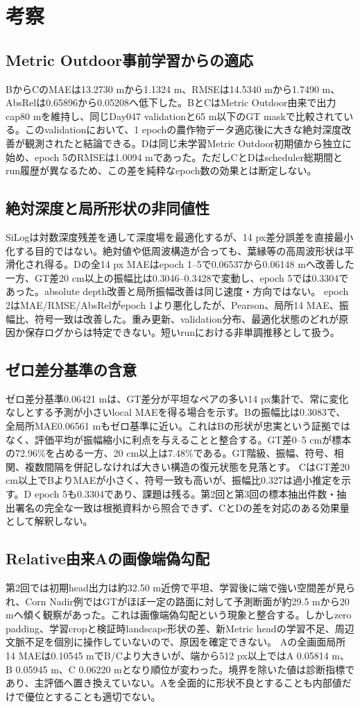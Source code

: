 \chapter{考察}
\section{Metric Outdoor事前学習からの適応}
BからCのMAEは13.2730 mから1.1324 m、RMSEは14.5340 mから1.7490 m、AbsRelは0.65896から0.05208へ低下した。BとCはMetric Outdoor由来で出力cap80 mを維持し、同じDay047 validationと65 m以下のGT maskで比較されている。このvalidationにおいて、1 epochの農作物データ適応後に大きな絶対深度改善が観測されたと結論できる。Dは同じ未学習Metric Outdoor初期値から独立に始め、epoch 5のRMSEは1.0094 mであった。ただしCとDはscheduler総期間とrun履歴が異なるため、この差を純粋なepoch数の効果とは断定しない。
\section{絶対深度と局所形状の非同値性}
SiLogは対数深度残差を通して深度場を最適化するが、14 px差分誤差を直接最小化する目的ではない。絶対値や低周波構造が合っても、葉縁等の高周波形状は平滑化され得る。Dの全14 px MAEはepoch 1--5で0.06537から0.06148 mへ改善した一方、GT差20 cm以上の振幅比は0.3046--0.3428で変動し、epoch 5では0.3304であった。absolute depth改善と局所振幅改善は同じ速度・方向ではない。
epoch 2はMAE/RMSE/AbsRelがepoch 1より悪化したが、Pearson、局所14 MAE、振幅比、符号一致は改善した。重み更新、validation分布、最適化状態のどれが原因か保存ログからは特定できない。短いrunにおける非単調推移として扱う。
\section{ゼロ差分基準の含意}
ゼロ差分基準0.06421 mは、GT差分が平坦なペアの多い14 px集計で、常に変化なしとする予測が小さいlocal MAEを得る場合を示す。Bの振幅比は0.3083で、全局所MAE0.06561 mもゼロ基準に近い。これはBの形状が忠実という証拠ではなく、評価平均が振幅縮小に利点を与えることと整合する。GT差0--5 cmが標本の72.96\%を占める一方、20 cm以上は7.48\%である。GT階級、振幅、符号、相関、複数間隔を併記しなければ大きい構造の復元状態を見落とす。
CはGT差20 cm以上でBよりMAEが小さく、符号一致も高いが、振幅比0.327は過小推定を示す。D epoch 5も0.3304であり、課題は残る。第2回と第3回の標本抽出件数・抽出署名の完全な一致は根拠資料から照合できず、CとDの差を対応のある効果量として解釈しない。
\section{Relative由来Aの画像端偽勾配}
第2回では初期head出力は約32.50 m近傍で平坦、学習後に端で強い空間差が見られ、Corn Nadir例ではGTがほぼ一定の路面に対して予測断面が約29.5 mから20 mへ傾く観察があった。これは画像端偽勾配という現象と整合する。しかしzero padding、学習cropと検証時landscape形状の差、新Metric headの学習不足、周辺文脈不足を個別に操作していないので、原因を確定できない。
Aの全画面局所14 MAEは0.10545 mでB/Cより大きいが、端から512 px以上ではA 0.05814 m、B 0.05945 m、C 0.06220 mとなり順位が変わった。境界を除いた値は診断指標であり、主評価へ置き換えていない。Aを全面的に形状不良とすることも内部値だけで優位とすることも適切でない。
